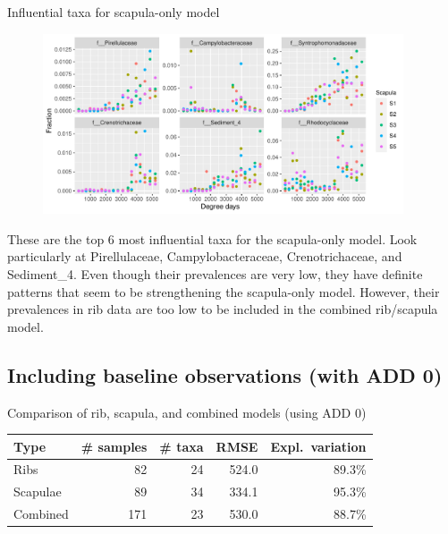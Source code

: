 \documentclass{beamer}
\begin{document}
\begin{frame}{Influential taxa for scapula-only model}

  \begin{center}
    \begin{figure}
      \includegraphics[height=2.1in]
        {w_bones/bacteria/use_families/w_scapulae/no_baseline/infl_scapula_family_no_baseline_scatter}
    \end{figure}
  \end{center}

  \vspace{-0.05in}

  \footnotesize{ \noindent These are the top 6 most influential taxa for the
    scapula-only model.  Look particularly at Pirellulaceae, Campylobacteraceae,
    Crenotrichaceae, and Sediment\_4.  Even though their prevalences are very
    low, they have definite patterns that seem to be strengthening the
    scapula-only model. However, their prevalences in rib data are too low to
    be included in the combined rib/scapula model.
    }

\end{frame}





\subsection{Including baseline observations (with ADD 0)}

\begin{frame}{Comparison of rib, scapula, and combined models (using ADD 0)}

  \begin{tabular}{lrrrr}
    Type & \# samples & \# taxa & RMSE & Expl.\ variation\\ \hline
    Ribs & 82 & 24 & 524.0 & 89.3\% \\
    Scapulae & 89 & 34 & 334.1 & 95.3\% \\
    Combined & 171 & 23 & 530.0 & 88.7\%
  \end{tabular}
  
  \vspace{0.2in}



\end{frame}
\end{document}

